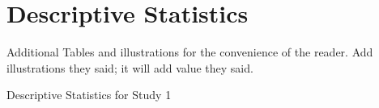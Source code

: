 \documentclass[
  man]{apa6}
\begin{document}
\section{Descriptive Statistics}\label{descriptive-statistics}

Additional Tables and illustrations for the convenience of the reader. Add illustrations they said; it will add value they said.

\begin{landscape}

\begin{table}[tbp]

\begin{center}
\begin{threeparttable}

\caption{\label{tab:s1_testtables}Descriptive Statistics for Study 1}


\end{threeparttable}
\end{center}
\end{table}
\end{landscape}
\end{document}
